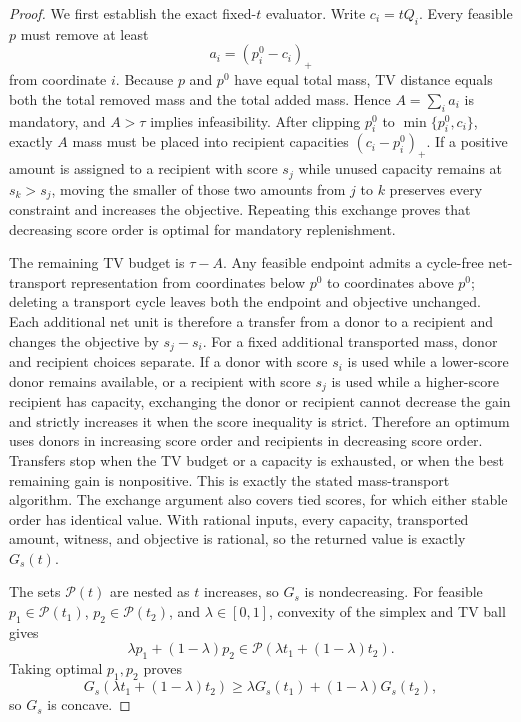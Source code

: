 \documentclass[preprint,review,12pt]{elsarticle}
\begin{document}
\begin{proof}
We first establish the exact fixed-\(t\) evaluator. Write \(c_i=tQ_i\).
Every feasible \(p\) must remove at least
\[
a_i=(p_i^0-c_i)_+
\]
from coordinate \(i\). Because \(p\) and \(p^0\) have equal total mass, TV
distance equals both the total removed mass and the total added mass. Hence
\(A=\sum_i a_i\) is mandatory, and \(A>\tau\) implies infeasibility. After
clipping \(p_i^0\) to \(\min\{p_i^0,c_i\}\), exactly \(A\) mass must be placed
into recipient capacities \((c_i-p_i^0)_+\). If a positive amount is assigned
to a recipient with score \(s_j\) while unused capacity remains at
\(s_k>s_j\), moving the smaller of those two amounts from \(j\) to \(k\)
preserves every constraint and increases the objective. Repeating this exchange
proves that decreasing score order is optimal for mandatory replenishment.

The remaining TV budget is \(\tau-A\). Any feasible endpoint admits a
cycle-free net-transport representation from coordinates below \(p^0\) to
coordinates above \(p^0\); deleting a transport cycle leaves both the endpoint
and objective unchanged. Each additional net unit is therefore a transfer from
a donor to a recipient and changes the objective by \(s_j-s_i\). For a fixed
additional transported mass, donor and recipient choices separate. If a donor
with score \(s_i\) is used while a lower-score donor remains available, or a
recipient with score \(s_j\) is used while a higher-score recipient has
capacity, exchanging the donor or recipient cannot decrease the gain and
strictly increases it when the score inequality is strict. Therefore an optimum
uses donors in increasing score order and recipients in decreasing score
order. Transfers stop when the TV budget or a capacity is exhausted, or when
the best remaining gain is nonpositive. This is exactly the stated
mass-transport algorithm. The exchange argument also covers tied scores, for
which either stable order has identical value. With rational inputs, every
capacity, transported amount, witness, and objective is rational, so the
returned value is exactly \(G_s(t)\).

The sets \(\mathcal{P}(t)\) are nested as \(t\) increases, so \(G_s\) is
nondecreasing. For feasible \(p_1\in\mathcal{P}(t_1)\),
\(p_2\in\mathcal{P}(t_2)\), and \(\lambda\in[0,1]\), convexity of the simplex
and TV ball gives
\[
\lambda p_1+(1-\lambda)p_2
\in\mathcal{P}(\lambda t_1+(1-\lambda)t_2).
\]
Taking optimal \(p_1,p_2\) proves
\[
G_s(\lambda t_1+(1-\lambda)t_2)
\geq\lambda G_s(t_1)+(1-\lambda)G_s(t_2),
\]
so \(G_s\) is concave.


\end{proof}
\end{document}
